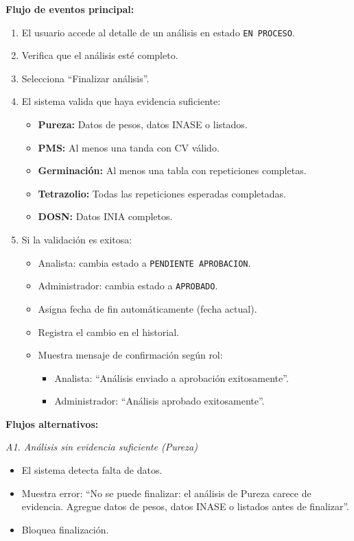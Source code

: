 \vspace{0.5em}
\noindent\textbf{Flujo de eventos principal:}
\begin{enumerate}[nosep]
    \item El usuario accede al detalle de un análisis en estado \texttt{EN PROCESO}.
    \item Verifica que el análisis esté completo.
    \item Selecciona ``Finalizar análisis''.
    \item El sistema valida que haya evidencia suficiente:
    \begin{itemize}[nosep]
        \item \textbf{Pureza:} Datos de pesos, datos INASE o listados.
        \item \textbf{PMS:} Al menos una tanda con CV válido.
        \item \textbf{Germinación:} Al menos una tabla con repeticiones completas.
        \item \textbf{Tetrazolio:} Todas las repeticiones esperadas completadas.
        \item \textbf{DOSN:} Datos INIA completos.
    \end{itemize}
    \item Si la validación es exitosa:
    \begin{itemize}[nosep]
        \item Analista: cambia estado a \texttt{PENDIENTE APROBACION}.
        \item Administrador: cambia estado a \texttt{APROBADO}.
        \item Asigna fecha de fin automáticamente (fecha actual).
        \item Registra el cambio en el historial.
        \item Muestra mensaje de confirmación según rol:
        \begin{itemize}[nosep]
            \item Analista: ``Análisis enviado a aprobación exitosamente''.
            \item Administrador: ``Análisis aprobado exitosamente''.
        \end{itemize}
    \end{itemize}
\end{enumerate}

\vspace{0.5em}
\noindent\textbf{Flujos alternativos:}

\vspace{0.3em}
\noindent\textit{A1. Análisis sin evidencia suficiente (Pureza)}
\begin{itemize}[nosep]
    \item El sistema detecta falta de datos.
    \item Muestra error: ``No se puede finalizar: el análisis de Pureza carece de evidencia. Agregue datos de pesos, datos INASE o listados antes de finalizar''.
    \item Bloquea finalización.
\end{itemize}

